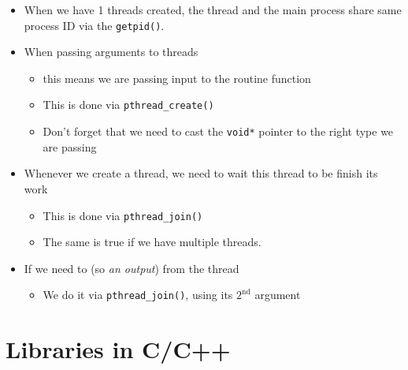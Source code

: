 \documentclass[12pt,a4paper]{book}
\begin{document}
\begin{itemize}

\item When we have 1 threads created, the thread and the main process share same process ID via the \verb|getpid()|.


\item When passing arguments to threads 

	\begin{itemize}
	
	\item this means we are passing input to the routine 		function
	
	\item This is done via \verb|pthread_create()|
	
	\item Don't forget that we need to cast the \verb|void*| pointer to the right type we are passing
		
	
	\end{itemize}

\item Whenever we create a thread, we need to wait this thread to be finish its work

	\begin{itemize}
	\item This is done via \verb|pthread_join()|
	
	\item The same is true if we have multiple threads.
	\end{itemize}

\item If we need to  (so \textit{an output}) from the thread

	\begin{itemize}

	\item We do it via \verb|pthread_join()|, using its $\mathrm{2}^\mathrm{nd}$ argument

	\end{itemize}

\end{itemize}



\chapter{Libraries in C/C++}
\end{document}
